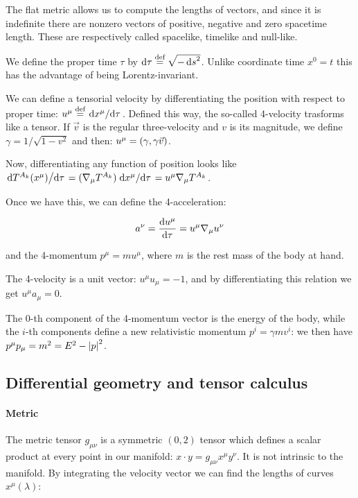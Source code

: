 \documentclass[main.tex]{subfiles}
\begin{document}
The flat metric allows us to compute the lengths of vectors, and since it is indefinite there are nonzero vectors of positive, negative and zero spacetime length. These are respectively called spacelike, timelike and null-like.

We define the proper time \(\tau\) by \(\dd{\tau} \stackrel{\text{def}}{=} \sqrt{-\dd{s}^2} \). Unlike coordinate time \(x^0 = t\) this has the advantage of being Lorentz-invariant.

We can define a tensorial velocity by differentiating the position with respect to proper time: \(u^\mu \stackrel{\text{def}}{=} \dv*{x^\mu}{\tau}\). Defined this way, the so-called 4-velocity trasforms like a tensor. If \(\vec{v}\) is the regular three-velocity and \(v\) is its magnitude, we define \(\gamma = 1/\sqrt{1-v^2} \) and then:
\(u^\mu = \qty(\gamma, \gamma \vec{v})\).

Now, differentiating any function of position looks like \(\dv*{T^{A_k}(x^\mu)}{\tau} = (\nabla_\mu T^{A_k}) \dv*{x^\mu}{\tau} = u^\mu \nabla_\mu T^{A_k} \).

Once we have this, we can define the 4-acceleration:

\begin{equation} \label{eq:covariant-acceleration-def}
    a^\nu = \dv{u^\mu}{\tau}  = u^\mu \nabla_\mu u^\nu
\end{equation}

and the 4-momentum \(p^\mu = m u^\mu\), where \(m\) is the rest mass of the body at hand.

The 4-velocity is a unit vector: \(u^\mu u_\mu = -1\), and by differentiating this relation we get \(u^\mu a_\mu = 0\).

The 0-th component of the 4-momentum vector is the energy of the body, while the $i$-th components define a new relativistic momentum \(p^i = \gamma m v^i\): we then have $p^\mu p_\mu = m^2 = E^2 - \abs{p}^2$.

\subsection{Differential geometry and tensor calculus}

\paragraph{Metric}

The metric tensor \(g_{\mu\nu}\) is a symmetric \((0,2)\) tensor which defines a scalar product at every point in our manifold: \(x \cdot y = g_{\mu\nu} x^\mu y^\nu\).
It is not intrinsic to the manifold.
By integrating the velocity vector we can find the lengths of curves \(x^\mu(\lambda)\):
\end{document}
